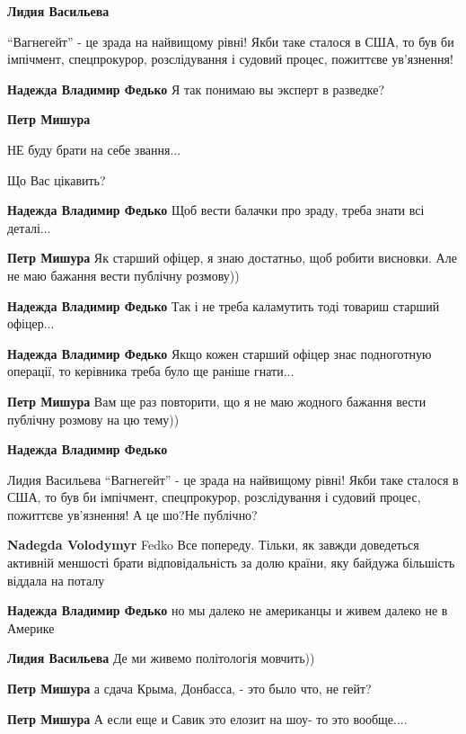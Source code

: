 \begin{itemize}
\begin{itemize}
\textbf{Лидия Васильева} 

\enquote{Вагнегейт} - це зрада на найвищому рівні! Якби таке сталося в США, то був би
імпічмент, спецпрокурор, розслідування і судовий процес, пожиттєве ув'язнення!

\begin{itemize} %
\textbf{Надежда Владимир Федько} Я так понимаю вы эксперт в разведке?

\textbf{Петр Мишура} 

НЕ буду брати на себе звання...

Що Вас цікавить?

\textbf{Надежда Владимир Федько} Щоб вести балачки про зраду, треба знати всі деталі...

\textbf{Петр Мишура} Як старший офіцер, я знаю достатньо, щоб робити висновки.
Але не маю бажання вести публічну розмову))

\textbf{Надежда Владимир Федько} Так і не треба каламутить тоді товариш старший офіцер...

\textbf{Надежда Владимир Федько} Якщо кожен старший офіцер знає подноготную операції, то керівника треба було ще раніше гнати...

\textbf{Петр Мишура} Вам ще раз повторити, що я не маю жодного бажання вести публічну розмову на цю тему))

\textbf{Надежда Владимир Федько} 

Лидия Васильева \enquote{Вагнегейт} - це зрада на найвищому рівні! Якби таке сталося в
США, то був би імпічмент, спецпрокурор, розслідування і судовий процес,
пожиттєве ув'язнення! А це шо?Не публічно?


\textbf{Nadegda Volodymyr} Fedko Все попереду. Тільки, як завжди доведеться активній меншості брати відповідальність за долю країни, яку байдужа більшість віддала на поталу

\textbf{Надежда Владимир Федько}
но мы далеко не американцы и живем далеко не в Америке

\textbf{Лидия Васильева} Де ми живемо політологія мовчить))

\textbf{Петр Мишура}
а сдача Крыма, Донбасса, - это было что, не гейт?

\textbf{Петр Мишура}
А если еще и Савик это елозит на шоу- то это вообще....
\end{itemize} %


\end{itemize}
\end{itemize}
